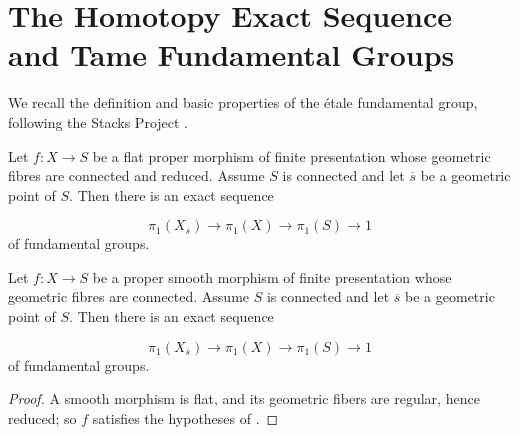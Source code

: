 
\section{The Homotopy Exact Sequence and Tame Fundamental Groups}\label{section:pi1_homotopy}
We recall the definition and basic properties of the \'etale fundamental group, following the Stacks Project
.

\begin{prop}[\stackstag{0C0J}]\label{prop:homotopy_exact_sequence}
Let $f : X \to S$ be a flat proper morphism of finite presentation whose geometric fibres are connected and reduced. Assume $S$ is connected and let $\overline{s}$ be a geometric point of $S$. Then there is an exact sequence

\[ \pi _1(X_{\overline{s}}) \to \pi _1(X) \to \pi _1(S) \to 1 \]
of fundamental groups.

\end{prop}

\begin{cor}\label{cor:etale_fundamental_group_smooth_proper}
    Let $f : X \to S$ be a proper smooth morphism of finite presentation whose geometric fibres are connected. Assume $S$ is connected and let $\overline{s}$ be a geometric point of $S$. Then there is an exact sequence

    \[ \pi _1(X_{\overline{s}}) \to \pi _1(X) \to \pi _1(S) \to 1 \]
    of fundamental groups.
\end{cor}
\begin{bluemath}
\begin{proof}
    A smooth morphism is flat, and its geometric fibers are regular, hence
    reduced; so $f$ satisfies the hypotheses of
    .
\end{proof}
\end{bluemath}

